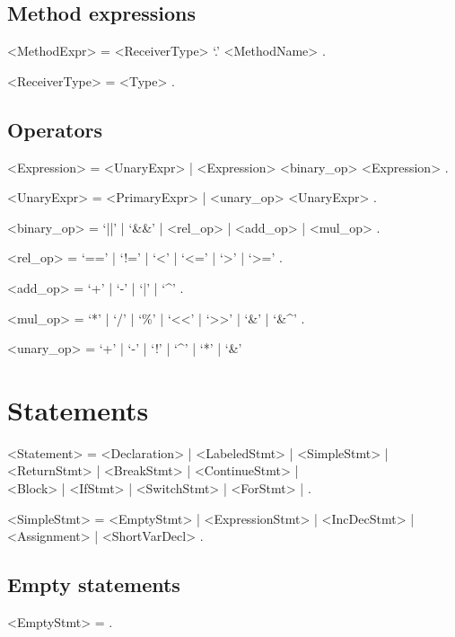 \documentclass{article}
\begin{document}
\subsection*{Method expressions}
\begin{grammar}
	<MethodExpr> = <ReceiverType> `.' <MethodName> .

	<ReceiverType> = <Type> .
\end{grammar}

\subsection*{Operators}
\begin{grammar}
	<Expression> = <UnaryExpr> | <Expression> <binary_op> <Expression> .

	<UnaryExpr> = <PrimaryExpr> | <unary_op> <UnaryExpr> .

	<binary_op>  = `||' | `\&\&' | <rel_op> | <add_op> | <mul_op> .

	<rel_op> = `==' | `!=' | `<' | `<=' | `>' | `>=' .

	<add_op> = `+' | `-' | `|' | `\^{}' .

	<mul_op> = `*' | `/' | `\%' | `<<' | `>>' | `\&' | `\&\^{}' .

	<unary_op> = `+' | `-' | `!' | `\^{}' | `*' | `\&' %
\end{grammar}


\section*{Statements}
\begin{grammar}
	<Statement> =
		<Declaration> | <LabeledStmt> | <SimpleStmt> | \\
		<ReturnStmt> | <BreakStmt> | <ContinueStmt> | \\
		<Block> | <IfStmt> | <SwitchStmt> | <ForStmt> | .

	<SimpleStmt> = <EmptyStmt> | <ExpressionStmt> | <IncDecStmt> | <Assignment> | <ShortVarDecl> . 
\end{grammar}

\subsection*{Empty statements}
\begin{grammar}
	<EmptyStmt> = .
\end{grammar} 
\end{document}
